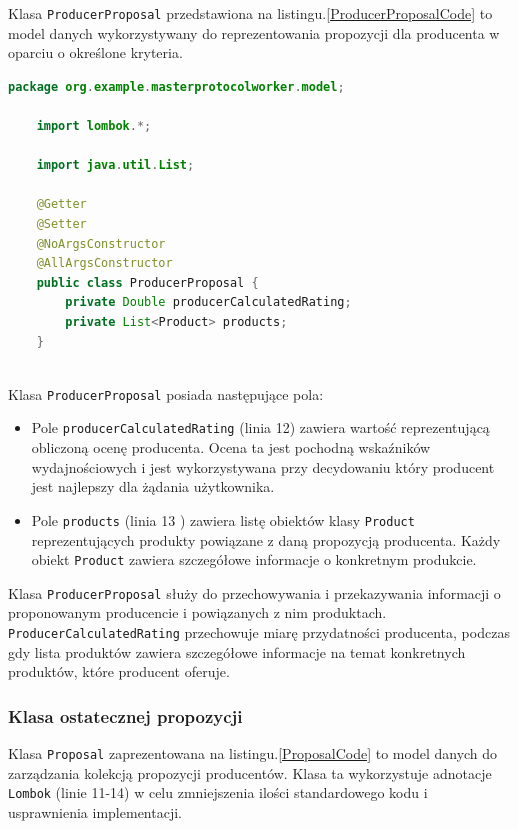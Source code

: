 Klasa \verb|ProducerProposal| przedstawiona na listingu.\ref{ProducerProposalCode} to model danych wykorzystywany do reprezentowania propozycji dla producenta w oparciu o określone kryteria.

\begin{lstlisting}[language=Java, caption=Kod klasy ProducerProposal,label=ProducerProposalCode]
    package org.example.masterprotocolworker.model;

    import lombok.*;
    
    import java.util.List;
    
    @Getter
    @Setter
    @NoArgsConstructor
    @AllArgsConstructor
    public class ProducerProposal {
        private Double producerCalculatedRating;
        private List<Product> products;
    }
    
\end{lstlisting}

Klasa \verb|ProducerProposal| posiada następujące pola:
\begin{itemize}
    \item Pole \verb|producerCalculatedRating| (linia 12) zawiera wartość reprezentującą obliczoną ocenę producenta. Ocena ta jest pochodną wskaźników wydajnościowych i jest wykorzystywana przy decydowaniu który producent jest najlepszy dla żądania użytkownika.
    \item Pole \verb|products| (linia 13 ) zawiera listę obiektów klasy \verb|Product| reprezentujących produkty powiązane z daną propozycją producenta. Każdy obiekt \verb|Product| zawiera szczegółowe informacje o konkretnym produkcie.
\end{itemize}

Klasa \verb|ProducerProposal| służy do przechowywania i przekazywania informacji o proponowanym producencie i powiązanych z nim produktach. \verb|ProducerCalculatedRating| przechowuje miarę przydatności producenta, podczas gdy lista produktów zawiera szczegółowe informacje na temat konkretnych produktów, które producent oferuje.

\subsubsection{Klasa ostatecznej propozycji}

Klasa \verb|Proposal| zaprezentowana na listingu.\ref{ProposalCode} to model danych do zarządzania kolekcją propozycji producentów. Klasa ta wykorzystuje adnotacje \verb|Lombok| (linie 11-14) w celu zmniejszenia ilości standardowego kodu i usprawnienia implementacji.

